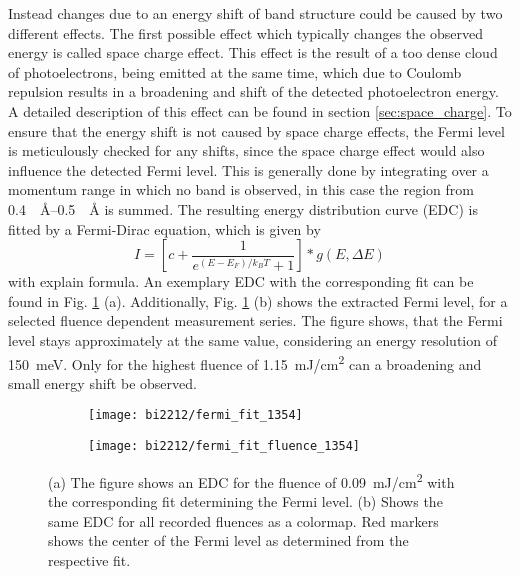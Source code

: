 Instead changes due to an energy shift of band structure could be caused by two different effects.
The first possible effect which typically changes the observed energy is called space charge effect.
This effect is the result of a too dense cloud of photoelectrons, being emitted at the same time, which due to Coulomb repulsion results in a broadening and shift of the detected photoelectron energy.
A detailed description of this effect can be found in section \ref{sec:space_charge}.
To ensure that the energy shift is not caused by space charge effects, the Fermi level is meticulously checked for any shifts, since the space charge effect would also influence the detected Fermi level.
This is generally done by integrating over a momentum range in which no band is observed, in this case the region from \qtyrange{0.4}{0.5}{\per\angstrom} is summed.
The resulting energy distribution curve (EDC) is fitted by a Fermi-Dirac equation, which is given by
\begin{equation}
	I = \left[ c + \frac{1}{e^{(E-E_F)/k_BT}+1} \right] * g(E,\Delta E)
\end{equation}
with explain formula.
An exemplary EDC with the corresponding fit can be found in Fig. \ref{fig:fermi_fit_bi2212} (a).
Additionally, Fig. \ref{fig:fermi_fit_bi2212} (b) shows the extracted Fermi level, for a selected fluence dependent measurement series.
The figure shows, that the Fermi level stays approximately at the same value, considering an energy resolution of \qty{150}{\milli\electronvolt}.
Only for the highest fluence of \qty{1.15}{\milli\joule/\centi\meter\squared} can a broadening and small energy shift be observed.

\begin{figure}[t]
	\centering
	\begin{subfigure}[b]{0.33\textwidth}
		\texttt{[image: bi2212/fermi\_fit\_1354]}
		\caption{}
	\end{subfigure}
	\begin{subfigure}[b]{0.33\textwidth}
		\texttt{[image: bi2212/fermi\_fit\_fluence\_1354]}
		\caption{}
	\end{subfigure}
	\caption{(a) The figure shows an EDC for the fluence of \qty{0.09}{\milli\joule/\centi\meter\squared} with the corresponding fit determining the Fermi level. (b) Shows the same EDC for all recorded fluences as a colormap. Red markers shows the center of the Fermi level as determined from the respective fit.}
	\label{fig:fermi_fit_bi2212}
\end{figure}

